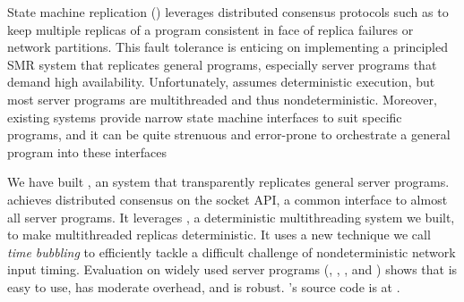 State machine replication (\smr) leverages distributed consensus protocols
such as \paxos to keep multiple replicas of a program consistent in face
of replica failures or network partitions.  This fault tolerance is
enticing on implementing a principled SMR system that replicates general
programs, especially server programs that demand high
availability. Unfortunately, \smr assumes deterministic execution, but
most server programs are multithreaded and thus nondeterministic.
Moreover, existing \smr systems provide narrow state machine interfaces to
suit specific programs, and it can be quite strenuous and error-prone to
orchestrate a general program into these interfaces

We have built \xxx, an \smr system that transparently replicates
general server programs. \xxx achieves distributed consensus on the socket
API, a common interface to almost all server programs.  It leverages \parrot,
a deterministic multithreading system we built, to make multithreaded replicas 
deterministic. It uses a new technique we call \emph{time bubbling} to 
efficiently tackle a difficult challenge of nondeterministic network input 
timing. Evaluation on \nprog widely used server programs (\eg, \apache, 
\clamav, and \mysql) shows that \xxx is easy to use, has moderate overhead, and 
is robust. \xxx's source code is at \github.
